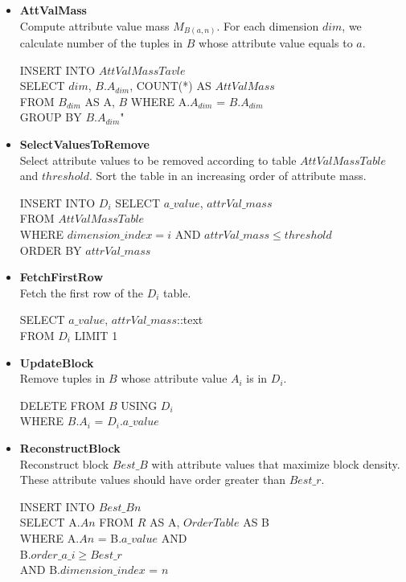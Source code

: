 \begin{itemize}
    \item \textbf{AttValMass}    \\
    Compute attribute value mass $M_{B(a,n)}$. For each dimension $dim$, we calculate number of the tuples in $B$ whose attribute value equals to $a$.
    \begin{algorithmic}
    \STATE INSERT INTO $AttValMassTavle$ \\
        SELECT $dim$, $B$.$A_{dim}$, COUNT(*) AS $AttValMass$ \\ 
        FROM $B_{dim}$ AS A, $B$ WHERE A.$A_{dim}$ = $B$.$A_{dim}$ \\
        GROUP BY $B$.$A_{dim}$"
    \end{algorithmic}
    \item \textbf{SelectValuesToRemove} \\
    Select attribute values to be removed according to table $AttValMassTable$ and $threshold$. Sort the table in an increasing order of attribute mass.
    \begin{algorithmic}
    \STATE  INSERT INTO $D_i$ SELECT $a\_value$, $attrVal\_mass$ \\
    FROM $AttValMassTable$  \\
    WHERE $dimension\_index = i$ AND $attrVal\_mass \leq threshold$ \\
    ORDER BY $attrVal\_mass$
    \end{algorithmic}
    \item \textbf{FetchFirstRow} \\
    Fetch the first row of the $D_i$ table.
    \begin{algorithmic}
    \STATE SELECT $a\_value$, $attrVal\_mass$::text \\
    FROM $D_i$ LIMIT 1
    \end{algorithmic}
    \item \textbf{UpdateBlock} \\
    Remove tuples in $B$ whose attribute value $A_i$ is in $D_i$.
    \begin{algorithmic}
    \STATE DELETE FROM $B$ USING $D_i$ \\
    WHERE $B$.$A_i$ = $D_i$.$a\_value$
    \end{algorithmic}
    \item \textbf{ReconstructBlock} \\
    Reconstruct block $Best\_B$ with attribute values that maximize block density. These attribute values should have order greater than $Best\_r$.
    \begin{algorithmic}
    \STATE INSERT INTO $Best\_Bn$ \\
        SELECT A.$An$ FROM $R$ AS A, $OrderTable$ AS B\\ 
        WHERE A.$An$ = B.$a\_value$ AND \\
        B.${{order\_a\_i} \geq {Best\_r}}$ \\
        AND B.$dimension\_index$ = $n$
    \end{algorithmic}
\end{itemize}

